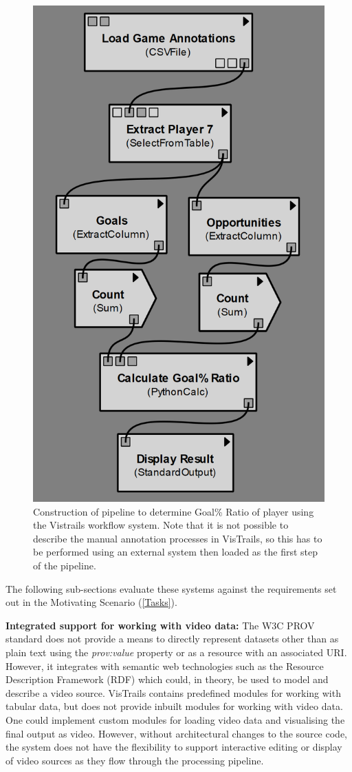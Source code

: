 \begin{figure}[!h]
\centering
\includegraphics[width=0.5\linewidth]{figs/paper/image5.png}
\caption{Construction of pipeline to determine Goal\%
Ratio of player using the Vistrails workflow system. Note that it is
not possible to describe the manual annotation processes in VisTrails,
so this has to be performed using an external system then loaded as the
first step of the pipeline.}
\label{VisTrails}
\end{figure}

The following sub-sections evaluate these systems against the requirements set out in the
Motivating Scenario (\ref{Tasks}).

\pagebreak{}
\textbf{Integrated support for working with video data:} The W3C PROV standard
does not provide a means to directly represent datasets other than
as plain text using the \textit{prov:value} property or as a resource with an associated URI. However, it integrates
with semantic web technologies such as the Resource Description
Framework (RDF) which could, in theory, be used to model and describe a
video source. VisTrails contains predefined modules for working with
tabular data, but does not provide inbuilt modules for working with
video data. One could implement custom modules for loading video data
and visualising the final output as video. However, without
architectural changes to the source code, the system does not have the flexibility
to support interactive editing or display of video sources as they flow
through the processing pipeline.

